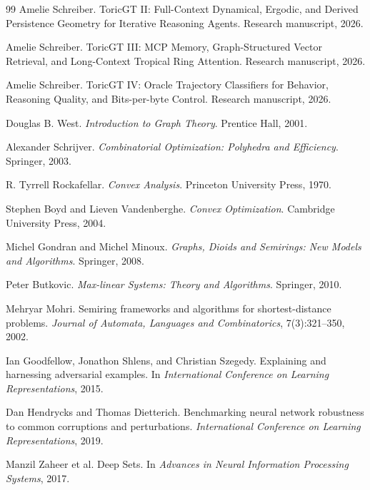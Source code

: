 \documentclass[11pt]{article}
\begin{document}
\begin{thebibliography}{99}
Amelie Schreiber.
\newblock ToricGT II: Full-Context Dynamical, Ergodic, and Derived Persistence Geometry for Iterative Reasoning Agents.
\newblock Research manuscript, 2026.

Amelie Schreiber.
\newblock ToricGT III: MCP Memory, Graph-Structured Vector Retrieval, and Long-Context Tropical Ring Attention.
\newblock Research manuscript, 2026.

Amelie Schreiber.
\newblock ToricGT IV: Oracle Trajectory Classifiers for Behavior, Reasoning Quality, and Bits-per-byte Control.
\newblock Research manuscript, 2026.

Douglas B. West.
\newblock \emph{Introduction to Graph Theory}.
\newblock Prentice Hall, 2001.

Alexander Schrijver.
\newblock \emph{Combinatorial Optimization: Polyhedra and Efficiency}.
\newblock Springer, 2003.

R. Tyrrell Rockafellar.
\newblock \emph{Convex Analysis}.
\newblock Princeton University Press, 1970.

Stephen Boyd and Lieven Vandenberghe.
\newblock \emph{Convex Optimization}.
\newblock Cambridge University Press, 2004.

Michel Gondran and Michel Minoux.
\newblock \emph{Graphs, Dioids and Semirings: New Models and Algorithms}.
\newblock Springer, 2008.

Peter Butkovic.
\newblock \emph{Max-linear Systems: Theory and Algorithms}.
\newblock Springer, 2010.

Mehryar Mohri.
\newblock Semiring frameworks and algorithms for shortest-distance problems.
\newblock \emph{Journal of Automata, Languages and Combinatorics}, 7(3):321--350, 2002.

Ian Goodfellow, Jonathon Shlens, and Christian Szegedy.
\newblock Explaining and harnessing adversarial examples.
\newblock In \emph{International Conference on Learning Representations}, 2015.

Dan Hendrycks and Thomas Dietterich.
\newblock Benchmarking neural network robustness to common corruptions and perturbations.
\newblock \emph{International Conference on Learning Representations}, 2019.

Manzil Zaheer et al.
\newblock Deep Sets.
\newblock In \emph{Advances in Neural Information Processing Systems}, 2017.


\end{thebibliography}
\end{document}
